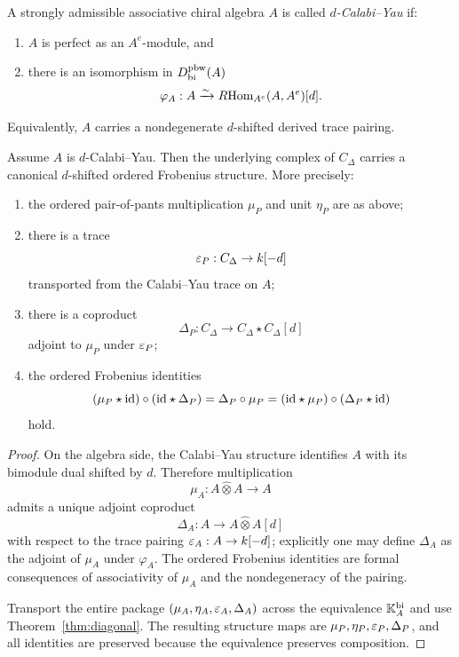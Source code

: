 \begin{definition}
A strongly admissible associative chiral algebra $A$ is called \emph{$d$-Calabi--Yau} if:
\begin{enumerate}[label=(\alph*)]
\item $A$ is perfect as an $A^e$-module, and
\item there is an isomorphism in $D^{\mathrm{pbw}}_{\mathrm{bi}}(A)$
\[
\varphi_A:A\xrightarrow{\sim}R\!\operatorname{Hom}_{A^e}(A,A^e)[d].
\]
\end{enumerate}
Equivalently, $A$ carries a nondegenerate $d$-shifted derived trace pairing.
\end{definition}

\begin{theorem}
\label{thm:CY}
Assume $A$ is $d$-Calabi--Yau. Then the underlying complex of $C_\Delta$ carries a canonical
$d$-shifted ordered Frobenius structure. More precisely:
\begin{enumerate}[label=(\roman*)]
\item the ordered pair-of-pants multiplication $\mu_P$ and unit $\eta_P$ are as above;
\item there is a trace
\[
\varepsilon_P:C_\Delta\to k[-d]
\]
transported from the Calabi--Yau trace on $A$;
\item there is a coproduct
\[
\Delta_P:C_\Delta\to C_\Delta\star C_\Delta[d]
\]
adjoint to $\mu_P$ under $\varepsilon_P$;
\item the ordered Frobenius identities
\[
(\mu_P\star \mathrm{id})\circ(\mathrm{id}\star \Delta_P)
=
\Delta_P\circ \mu_P
=
(\mathrm{id}\star\mu_P)\circ(\Delta_P\star \mathrm{id})
\]
hold.
\end{enumerate}
\end{theorem}

\begin{proof}
On the algebra side, the Calabi--Yau structure identifies $A$ with its bimodule dual shifted by
$d$. Therefore multiplication
\[
\mu_A:A\widehat\otimes A\to A
\]
admits a unique adjoint coproduct
\[
\Delta_A:A\to A\widehat\otimes A[d]
\]
with respect to the trace pairing $\varepsilon_A:A\to k[-d]$; explicitly one may define $\Delta_A$ as the
adjoint of $\mu_A$ under $\varphi_A$. The ordered Frobenius identities are formal consequences of
associativity of $\mu_A$ and the nondegeneracy of the pairing.

Transport the entire package $(\mu_A,\eta_A,\varepsilon_A,\Delta_A)$ across the equivalence
$\mathbb{K}_A^{\mathrm{bi}}$ and use Theorem~\ref{thm:diagonal}. The resulting structure maps are
$\mu_P,\eta_P,\varepsilon_P,\Delta_P$, and all identities are preserved because the equivalence preserves
composition.
\end{proof}

